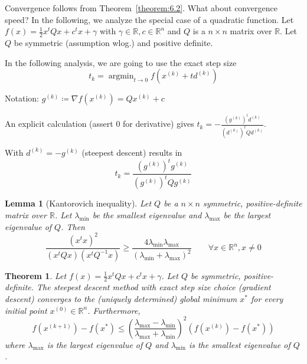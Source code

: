 \documentclass[a4paper]{article}
\newcounter{lecref}[subsection]
\numberwithin{lecref}{subsection}
\newtheorem{theorem}[lecref]{Theorem}
\newtheorem{lemma}[lecref]{Lemma}
\DeclareMathOperator{\argmin}{argmin}
\begin{document}
Convergence follows from Theorem~\ref{theorem:6.2}.
What about convergence speed? In the following, we analyze the special case of a quadratic function.
Let $f(x) = \frac12 x^t Qx + c^t x + \gamma$ with $\gamma \in \mathbb R, c \in \mathbb R^n$ and $Q$ is a $n\times n$ matrix over $\mathbb R$. Let $Q$ be symmetric (assumption wlog.) and positive definite.

In the following analysis, we are going to use the exact step size
\[ t_k = \argmin_{t \to 0} f(x^{(k)} + td^{(k)}) \]

Notation: $g^{(k)} \coloneqq \nabla f(x^{(k)}) = Qx^{(k)} + c$

An explicit calculation (assert 0 for derivative) gives $t_k = -\frac{(g^{(k)})^l d^{(k)}}{(d^{(k)})^t Q d^{(k)}}$.

With $d^{(k)} = -g^{(k)}$ (steepest descent) results in
\[ t_k = \frac{\left(g^{(k)}\right)^t g^{(k)}}{\left(g^{(k)}\right)^t Q g^{(k)}} \]

\begin{lemma}[Kantorovich inequality]
	\label{lemma:6.3}
	Let $Q$ be a $n \times n$ symmetric, positive-definite matrix over $\mathbb R$.
	Let $\lambda_{\text{min}}$ be the smallest eigenvalue and $\lambda_{\text{max}}$ be the largest eigenvalue of $Q$.
	Then
	\[ \frac{(x^t x)^2}{(x^t Qx)(x^t Q^{-1} x)} \geq \frac{4 \lambda_{\text{min}} \lambda_{\text{max}}}{(\lambda_{\text{min}} + \lambda_{\text{max}})^2} \qquad \forall x \in \mathbb R^n, x \neq 0 \]
\end{lemma}

\begin{theorem}
	\label{theorem:6.4}
	Let $f(x) = \frac12 x^t Qx + c^t x + \gamma$. Let $Q$ be symmetric, positive-definite.
	The steepest descent method with exact step size choice (gradient descent) converges to the (uniquely determined) global minimum $x^*$ for every initial point $x^{(0)} \in \mathbb R^n$. Furthermore,
	\[ f(x^{(k+1)}) - f(x^*) \leq \left(\frac{\lambda_{\text{max}} - \lambda_{\text{min}}}{\lambda_{\text{max}} + \lambda_{\text{min}}}\right)^2 (f(x^{(k)}) - f(x^*)) \]
	where $\lambda_{\text{max}}$ is the largest eigenvalue of $Q$ and $\lambda_{\text{min}}$ is the smallest eigenvalue of $Q$.
\end{theorem}
\end{document}

